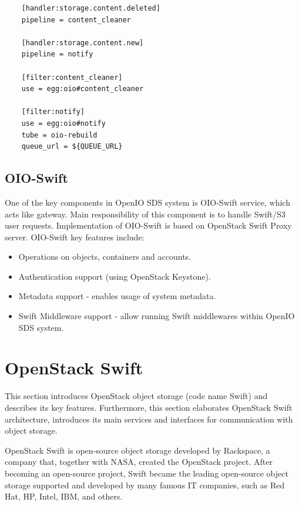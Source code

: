     \lstset{
        caption=Example of event-agent handler configuration,
        label=lst:event-agent-handlers
    }
    \begin{minipage}{\linewidth}
    \begin{lstlisting}
    [handler:storage.content.deleted]
    pipeline = content_cleaner

    [handler:storage.content.new]
    pipeline = notify

    [filter:content_cleaner]
    use = egg:oio#content_cleaner

    [filter:notify]
    use = egg:oio#notify
    tube = oio-rebuild
    queue_url = ${QUEUE_URL}
    \end{lstlisting}
    \end{minipage}

    \subsection{OIO-Swift}
    One of the key components in OpenIO SDS system is OIO-Swift service, which acts like gateway. Main responsibility of this component is to handle Swift/S3 user requests. Implementation of OIO-Swift is based on OpenStack Swift Proxy server. OIO-Swift key features include:
    \begin{itemize}
        \item Operations on objects, containers and accounts.
        \item Authentication support (using OpenStack Keystone).
        \item Metadata support - enables usage of system metadata.
        \item Swift Middleware support - allow running Swift middlewares within OpenIO SDS system.
    \end{itemize}

\newpage
\section{OpenStack Swift}
    This section introduces OpenStack object storage (code name Swift) and describes its key features. Furthermore, this section elaborates OpenStack Swift architecture, introduces its main services and interfaces for communication with object storage.

    OpenStack Swift is open-source object storage developed by Rackspace, a company that, together with NASA, created the OpenStack project. After becoming an open-source project, Swift became the leading open-source object storage supported and developed by many famous IT companies, such as Red Hat, HP, Intel, IBM, and others.

